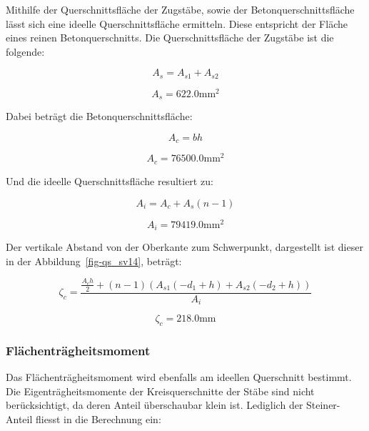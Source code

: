 \documentclass[
  12pt,
  letterpaper,
  egregdoesnotlikesansseriftitles]{scrreprt}
\begin{document}
Mithilfe der Querschnittsfläche der Zugstäbe, sowie der
Betonquerschnittsfläche lässt sich eine ideelle Querschnittsfläche
ermitteln. Diese entspricht der Fläche eines reinen Betonquerschnitts.
Die Querschnittsfläche der Zugstäbe ist die folgende:

\begin{equation}A_{s} = A_{s 1} + A_{s 2}\end{equation}

\begin{equation}A_{s} = 622.0 \text{mm}^{2}\end{equation}

Dabei beträgt die Betonquerschnittsfläche:

\begin{equation}A_{c} = b h\end{equation}

\begin{equation}A_{c} = 76500.0 \text{mm}^{2}\end{equation}

Und die ideelle Querschnittsfläche resultiert zu:

\begin{equation}A_{i} = A_{c} + A_{s} \left(n - 1\right)\end{equation}

\begin{equation}A_{i} = 79419.0 \text{mm}^{2}\end{equation}

Der vertikale Abstand von der Oberkante zum Schwerpunkt, dargestellt ist
dieser in der Abbildung~\ref{fig-qs_sv14}, beträgt:

\begin{equation}\zeta_{c} = \frac{\frac{A_{c} h}{2} + \left(n - 1\right) \left(A_{s 1} \left(- d_{1} + h\right) + A_{s 2} \left(- d_{2} + h\right)\right)}{A_{i}}\end{equation}

\begin{equation}\zeta_{c} = 218.0 \text{mm}\end{equation}

\subsubsection{Flächenträgheitsmoment}\label{fluxe4chentruxe4gheitsmoment-1}

Das Flächenträgheitsmoment wird ebenfalls am ideellen Querschnitt
bestimmt. Die Eigenträgheitsmomente der Kreisquerschnitte der Stäbe sind
nicht berücksichtigt, da deren Anteil überschaubar klein ist. Lediglich
der Steiner-Anteil fliesst in die Berechnung ein:
\end{document}
